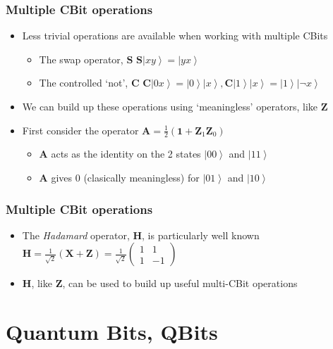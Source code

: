 \documentclass{beamer}
\newcommand{\ket}[1]{\left|{#1}\right\rangle}
\newcommand{\aop}{\textbf{A}}
\newcommand{\cop}{\textbf{C}}
\newcommand{\hop}{\textbf{H}}
\newcommand{\iop}{\textbf{1}}
\newcommand{\sop}{\textbf{S}}
\newcommand{\xop}{\textbf{X}}
\newcommand{\zop}{\textbf{Z}}
\newcommand{\zvec}{\ket{0}}
\newcommand{\ovec}{\ket{1}}
\begin{document}
  \begin{frame}
    \frametitle{Multiple CBit operations}
    \begin{itemize}
      \item{Less trivial operations are available when working with multiple CBits}
      \begin{itemize}
        \item{The swap operator, $\sop$} \linebreak
          $\sop\ket{xy} = \ket{yx}$
        \item{The controlled `not', $\cop$} \linebreak
          $\cop\ket{0x} = \zvec\ket{x}, \cop\ovec\ket{x} = \ovec\ket{\neg x}$
      \end{itemize}
      \item{We can build up these operations using `meaningless' operators, like $\zop$}
      \item{First consider the operator $\aop = \frac{1}{2}(\iop + \zop_{1}\zop_{0})$}
      \begin{itemize}
        \item{$\aop$ acts as the identity on the 2 states $\ket{00}$ and $\ket{11}$}
        \item{$\aop$ gives $0$ (clasically meaningless) for $\ket{01}$ and $\ket{10}$}
      \end{itemize}
    \end{itemize}
  \end{frame}

  \begin{frame}
    \frametitle{Multiple CBit operations}
    \begin{itemize}
      \item{The \textit{Hadamard} operator, $\hop$, is particularly well known} \linebreak
        $\hop = \frac{1}{\sqrt{2}}(\xop + \zop) =
         \frac{1}{\sqrt{2}} \begin{pmatrix}1 & 1 \\ 1 & -1\end{pmatrix}$
         \item{$\hop$, like $\zop$, can be used to build up useful multi-CBit operations}
    \end{itemize}
  \end{frame}

  \section{Quantum Bits, QBits}
\end{document}
